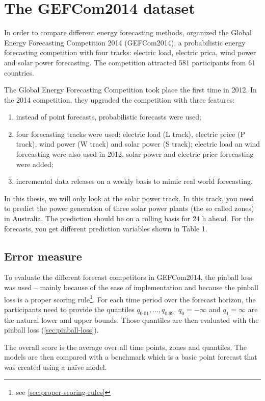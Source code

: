 \section{The GEFCom2014 dataset}

In order to compare different energy forecasting methods, 
\Textcite{Hong2016} organized the Global Energy Forecasting Competition 2014 (GEFCom2014), 
a probabilistic energy forecasting competition with four tracks: 
electric load, electric prica, wind power and solar power forecasting. 
The competition attracted 581 participants from 61 countries. 

The Global Energy Forecasting Competition took place the first time in 2012. 
In the 2014 competition, they upgraded the competition with three features: 
\begin{enumerate}
    \item instead of point forecasts, probabilistic forecasts were used;
    \item four forecasting tracks were used: electric load (L track), 
    electric price (P track), wind power (W track) and solar power (S track);
    electric load an wind forecasting were also used in 2012, solar power and 
    electric price forecasting were added;
    \item incremental data releases on a weekly basis to mimic real world forecasting.
\end{enumerate}

In this thesis, we will only look at the solar power track. 
In this track, you need to predict the power generation of three 
solar power plants (the so called zones) in Australia. 
The prediction should be on a rolling basis for 24 h ahead. 
For the forecasts, you get different prediction variables shown in Table 1. 

\subsection{Error measure}

To evaluate the different forecast competitors in GEFCom2014, 
the pinball loss was used -- mainly because of the ease of implementation 
and because the pinball loss is a proper scoring rule\footnote{see \ref{sec:proper-scoring-rules}}. 
For each time period over the forecast horizon, the participants need to 
provide the quantiles \(q_{0.01}, \ldots, q_{0.99}\). 
\(q_0 = -\infty\) and \(q_1 = \infty\) are the natural lower and upper bounds. 
Those quantiles are then evaluated with the pinball loss (\ref{sec:pinball-loss}).

The overall score is the average over all time points, zones and quantiles.
The models are then compared with a benchmark which is a basic point forecast 
that was created using a na\"{i}ve model.